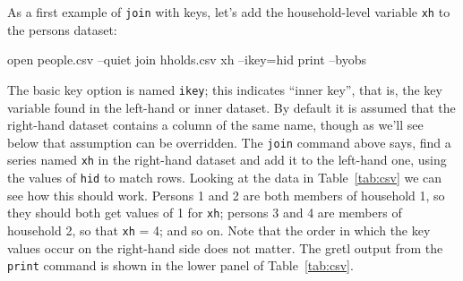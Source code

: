 As a first example of \texttt{join} with keys, let's add the
household-level variable \texttt{xh} to the persons dataset:
%
\begin{code}
open people.csv --quiet
join hholds.csv xh --ikey=hid
print --byobs
\end{code}

The basic key option is named \texttt{ikey}; this indicates ``inner
key'', that is, the key variable found in the left-hand or inner
dataset. By default it is assumed that the right-hand dataset contains
a column of the same name, though as we'll see below that assumption
can be overridden. The \texttt{join} command above says, find a series
named \texttt{xh} in the right-hand dataset and add it to the
left-hand one, using the values of \texttt{hid} to match rows.
Looking at the data in Table~\ref{tab:csv} we can see how this should
work. Persons 1 and 2 are both members of household 1, so they should
both get values of 1 for \texttt{xh}; persons 3 and 4 are members of
household 2, so that \texttt{xh} = 4; and so on. Note that the order
in which the key values occur on the right-hand side does not matter.
The gretl output from the \texttt{print} command is shown in the lower
panel of Table~\ref{tab:csv}.

